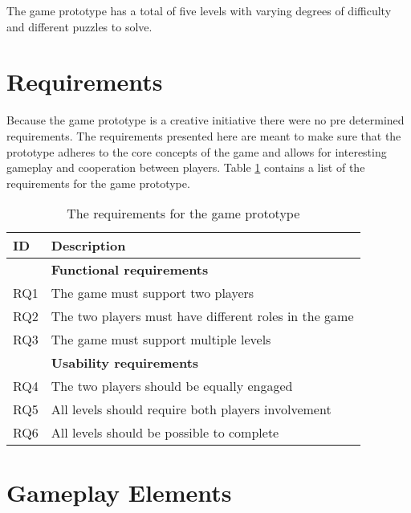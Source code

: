The game prototype has a total of five levels with varying degrees of difficulty and different puzzles to solve.





\section{Requirements}
Because the game prototype is a creative initiative there were no pre determined requirements. The requirements presented here are meant to make sure that the prototype adheres to the core concepts of the game and allows for interesting gameplay and cooperation between players. Table \ref{tab:requirements} contains a list of the requirements for the game prototype. 



\begin{table}[!ht]
	\centering
	\caption{The requirements for the game prototype}
	\label{tab:requirements}
	\begin{tabular}{|l|l|}
		\hline
		\textbf{ID} & \textbf{Description}                                  \\ \hline
					& \textbf{Functional requirements}                      \\ \hline
		RQ1         & The game must support two players                     \\
		RQ2         & The two players must have different roles in the game \\
		RQ3         & The game must support multiple levels                 \\ \hline
					& \textbf{Usability requirements}                       \\ \hline
		RQ4         & The two players should be equally engaged             \\
		RQ5         & All levels should require both players involvement    \\
		RQ6         & All levels should be possible to complete             \\ \hline
	\end{tabular}
\end{table}

\section{Gameplay Elements}
